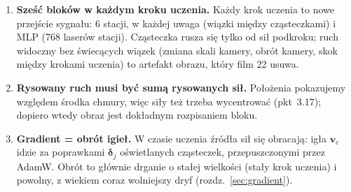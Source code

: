 \documentclass[a4paper,11pt]{article}
\begin{document}
\begin{enumerate}
druga część to hipoteza do sprawdzenia.
\item \textbf{Sześć bloków w każdym kroku uczenia.} Każdy krok uczenia to nowe przejście sygnału: 6 stacji, w każdej uwaga (wiązki
między cząsteczkami) i MLP (768 laserów stacji). Cząsteczka rusza się tylko od sił podkroku; ruch widoczny bez świecących wiązek
(zmiana skali kamery, obrót kamery, skok między krokami uczenia) to artefakt obrazu, który film 22 usuwa.
\item \textbf{Rysowany ruch musi być sumą rysowanych sił.} Położenia pokazujemy względem środka chmury, więc siły też trzeba wycentrować
(pkt~3.17); dopiero wtedy obraz jest dokładnym rozpisaniem bloku.
\item \textbf{Gradient = obrót igieł.} W czasie uczenia źródła sił się obracają: igła $\bm v_c$ idzie za poprawkami $\bm\delta_j$
oświetlanych cząsteczek, przepuszczonymi przez AdamW. Obrót to głównie drganie o stałej wielkości (stały krok uczenia) i powolny,
z wiekiem coraz wolniejszy dryf (rozdz.~\ref{sec:gradient}).
\end{enumerate}

\end{document}

